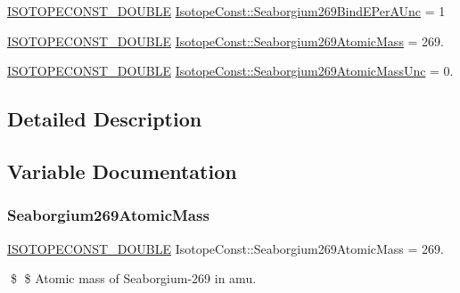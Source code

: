 \begin{DoxyCompactItemize}
\mbox{\hyperlink{group___isotope_const-_macros_ga8f45a7272ce02c0b4c65c44636ed719a}{I\+S\+O\+T\+O\+P\+E\+C\+O\+N\+S\+T\+\_\+\+D\+O\+U\+B\+LE}} \mbox{\hyperlink{group___isotope_const-_seaborgium-_sg269_gac164849881b093c3158e2bb16a8b9a11}{Isotope\+Const\+::\+Seaborgium269\+Bind\+E\+Per\+A\+Unc}} = 1
\item 
\mbox{\hyperlink{group___isotope_const-_macros_ga8f45a7272ce02c0b4c65c44636ed719a}{I\+S\+O\+T\+O\+P\+E\+C\+O\+N\+S\+T\+\_\+\+D\+O\+U\+B\+LE}} \mbox{\hyperlink{group___isotope_const-_seaborgium-_sg269_ga70380bb6651cc5d477a95ee2fd5c45ce}{Isotope\+Const\+::\+Seaborgium269\+Atomic\+Mass}} = 269.
\item 
\mbox{\hyperlink{group___isotope_const-_macros_ga8f45a7272ce02c0b4c65c44636ed719a}{I\+S\+O\+T\+O\+P\+E\+C\+O\+N\+S\+T\+\_\+\+D\+O\+U\+B\+LE}} \mbox{\hyperlink{group___isotope_const-_seaborgium-_sg269_ga5bf36badb1cddcaea88b88317791f3be}{Isotope\+Const\+::\+Seaborgium269\+Atomic\+Mass\+Unc}} = 0.
\end{DoxyCompactItemize}


\subsection{Detailed Description}


\subsection{Variable Documentation}
\mbox{\label{group___isotope_const-_seaborgium-_sg269_ga70380bb6651cc5d477a95ee2fd5c45ce}} 
\subsubsection{\texorpdfstring{Seaborgium269\+Atomic\+Mass}{Seaborgium269AtomicMass}}
{\footnotesize\ttfamily \mbox{\hyperlink{group___isotope_const-_macros_ga8f45a7272ce02c0b4c65c44636ed719a}{I\+S\+O\+T\+O\+P\+E\+C\+O\+N\+S\+T\+\_\+\+D\+O\+U\+B\+LE}} Isotope\+Const\+::\+Seaborgium269\+Atomic\+Mass = 269.}

\$ \$ Atomic mass of Seaborgium-\/269 in amu. \mbox{\label{group___isotope_const-_seaborgium-_sg269_ga5bf36badb1cddcaea88b88317791f3be}} 
